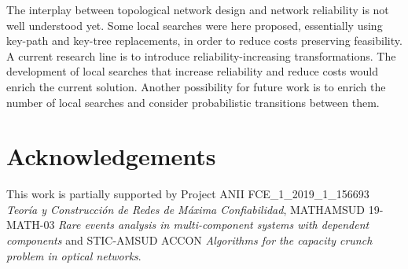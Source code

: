 \documentclass{llncs}
\begin{document}
The interplay between topological network design and network reliability is not well understood yet. Some local searches were here proposed, essentially using key-path and key-tree replacements, in order to reduce costs preserving feasibility. A current research line is to introduce reliability-increasing transformations.  
The development of local searches that increase reliability and reduce costs would enrich the current solution. Another possibility for future work is to enrich the number of local searches and consider 
probabilistic transitions between them. 

\section{Acknowledgements}
This work is partially supported by Project ANII FCE\_1\_2019\_1\_156693 \emph{Teor\'ia y Construcci\'on de Redes de M\'axima  Confiabilidad}, MATHAMSUD 19-MATH-03 \emph{Rare events analysis in multi-component systems with dependent components} and
STIC-AMSUD ACCON \emph{Algorithms for the capacity crunch problem in optical networks}. 

%



\end{document}
